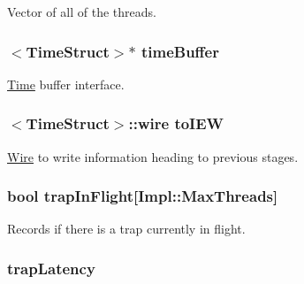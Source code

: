 \label{classDefaultCommit_afe9da004c5a3f37cbb72fa3763d4c0d1}
Vector of all of the threads. \hypertarget{classDefaultCommit_a83f9ee976e732665aeb08dbc19acfd45}{
\subsubsection[{timeBuffer}]{$<${\bf TimeStruct}$>$$\ast$ {\bf timeBuffer}}}
\label{classDefaultCommit_a83f9ee976e732665aeb08dbc19acfd45}
\hyperlink{classTime}{Time} buffer interface. \hypertarget{classDefaultCommit_a2877bfe6e25eb731f28c8c5a9ba55391}{
\subsubsection[{toIEW}]{$<${\bf TimeStruct}$>$::wire {\bf toIEW}}}
\label{classDefaultCommit_a2877bfe6e25eb731f28c8c5a9ba55391}
\hyperlink{classWire}{Wire} to write information heading to previous stages. \hypertarget{classDefaultCommit_a4e366a325229901e41b68ff07e5f556a}{
\subsubsection[{trapInFlight}]{\setlength{\rightskip}{0pt plus 5cm}bool {\bf trapInFlight}\mbox{[}Impl::MaxThreads\mbox{]}}}
\label{classDefaultCommit_a4e366a325229901e41b68ff07e5f556a}
Records if there is a trap currently in flight. \hypertarget{classDefaultCommit_a0bfffaa2e5f9c7e79353e61146950a9a}{
\subsubsection[{trapLatency}]{ {\bf trapLatency}}}
